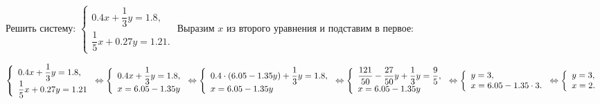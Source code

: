  Решить систему: $
\left\{
\begin{array}{l}
0.4x+\dfrac{1}{3}y=1.8,\\
\dfrac{1}{5}x+0.27y=1.21.
\end{array}
\right.
$
\Solution
Выразим $x$ из второго уравнения и подставим в первое:
\begin{center}$
\left\{
\begin{array}{l}
0.4x+\dfrac{1}{3}y=1.8,\\
\dfrac{1}{5}x+0.27y=1.21
\end{array}
\right. \hm\Leftrightarrow
\left\{
\begin{array}{l}
0.4x+\dfrac{1}{3}y=1.8,\\
x=6.05-1.35y
\end{array}
\right. \hm\Leftrightarrow
\left\{
\begin{array}{l}
0.4\cdot (6.05-1.35y)+\dfrac{1}{3}y=1.8,\\
x=6.05-1.35y
\end{array}
\right. \hm\Leftrightarrow
\left\{
\begin{array}{l}
\dfrac{121}{50}-\dfrac{27}{50}y+\dfrac{1}{3}y=\dfrac{9}{5},\\
x=6.05-1.35y
\end{array}
\right. \hm\Leftrightarrow
\left\{
\begin{array}{l}
y=3,\\
x=6.05-1.35\cdot 3.
\end{array}
\right. \hm\Leftrightarrow
\left\{
\begin{array}{l}
y=3,\\
x=2.
\end{array}
\right.$
\end{center}
